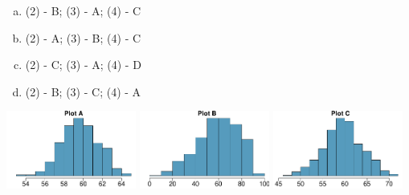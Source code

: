 \documentclass[11pt,containsverbatim,handout,xcolor=xelatex,dvipsnames,table]{beamer}
\newcommand{\solnMult}[1]{#1}
\begin{document}
\begin{frame}
{
\vspace{-0.5cm}
{\small
\begin{enumerate}[(a)]
\item (2) - B; (3) - A; (4) - C
\item (2) - A; (3) - B; (4) - C
\item (2) - C; (3) - A; (4) - D
\item \solnMult{(2) - B; (3) - C; (4) - A}
\end{enumerate}
}
}
\vspace{-0.25cm}
\includegraphics[width=0.32\textwidth]{figures/cltSimLS/cltSimLS_n81}
\includegraphics[width=0.32\textwidth]{figures/cltSimLS/cltSimLS_samp}
\includegraphics[width=0.32\textwidth]{figures/cltSimLS/cltSimLS_n18}

\end{frame}
\end{document}
